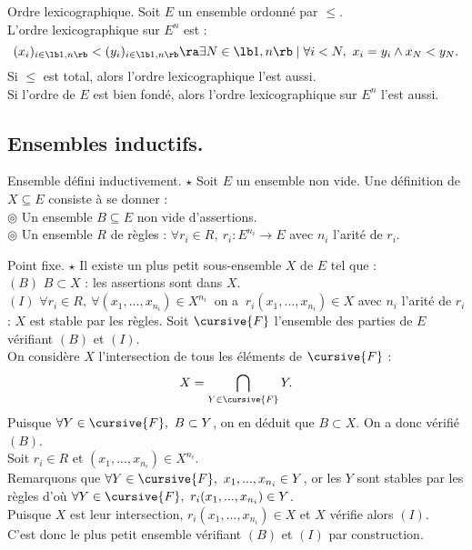 \documentclass[french, 11pt]{article}
\begin{document}
\begin{corr}{Ordre lexicographique.}{}
    Soit $E$ un ensemble ordonné par $\leq$.\\
    L'ordre lexicographique sur $E^n$ est :
    \begin{equation*}
        (x_i)_{i\in\lb1,n\rb} < (y_i)_{i\in\lb1,n\rb} \ra \exists N \in \lb1,n\rb \mid \forall i < N, ~ x_i = y_i \land x_N < y_N.
    \end{equation*}
    Si $\leq$ est total, alors l'ordre lexicographique l'est aussi.\\
    Si l'ordre de $E$ est bien fondé, alors l'ordre lexicographique sur $E^n$ l'est aussi.
\end{corr}

\subsection{Ensembles inductifs.}{}

\begin{defi}{Ensemble défini inductivement. $\star$}{}
    Soit $E$ un ensemble non vide. Une définition de $X \subseteq E$ consiste à se donner :\\
    \hspace*{2em}$\circledcirc$ Un ensemble $B\subseteq E$ non vide d'assertions.\\
    \hspace*{2em}$\circledcirc$ Un ensemble $R$ de règles : $\forall r_i \in R, ~ r_i : E^{n_i} \to E$ avec $n_i$ l'arité de $r_i$.
\end{defi}

\begin{thm}{Point fixe. $\star$}{}
    Il existe un plus petit sous-ensemble $X$ de $E$ tel que :\\
    \hspace*{2em}$(B)$ $B \subset X$ : les assertions sont dans $X$.\\
    \hspace*{2em}$(I)$ $\forall r_i \in R, ~ \forall (x_1, ..., x_{n_i}) \in X^{n_i} ~ $ on a $ ~ r_i(x_1,...,x_{n_i})\in X$ avec $n_i$ l'arité de $r_i$ : $X$ est stable par les règles.
    \tcblower
    Soit $\cursive{F}$ l'ensemble des parties de $E$ vérifiant $(B)$ et $(I)$.\\
    On considère $X$ l'intersection de tous les éléments de $\cursive{F}$ :
    \begin{equation*}
        X = \bigcap_{Y\in\cursive{F}}Y.
    \end{equation*}
    Puisque $\forall Y\in \cursive{F}, ~ B\subset Y$, on en déduit que $B \subset X$. On a donc vérifié $(B)$.\\
    Soit $r_i\in R$ et $(x_1, ..., x_{n_i})\in X^{n_i}$.\\
    Remarquons que $\forall Y \in \cursive{F}, ~ x_1, ..., x_{n_i} \in Y$, or les $Y$ sont stables par les règles d'où $\forall Y \in \cursive{F}, ~ r_i(x_1, ..., x_{n_i})\in Y$.\\
    Puisque $X$ est leur intersection, $r_i(x_1, ..., x_{n_i})\in X$ et $X$ vérifie alors $(I)$.\\
    C'est donc le plus petit ensemble vérifiant $(B)$ et $(I)$ par construction.
\end{thm}
\end{document}

